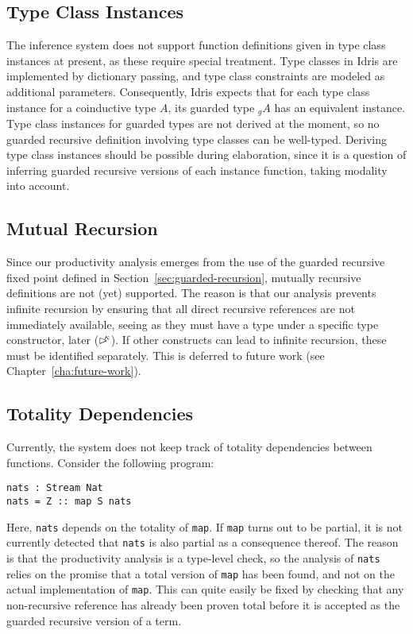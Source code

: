 \subsection{Type Class Instances}
\label{sec:type-class-instances}
The inference system does not support function definitions given in type class
instances at present, as these require special treatment. Type classes in Idris
are implemented by dictionary passing, and type class constraints are modeled as
additional parameters. Consequently, Idris expects that for each type class
instance for a coinductive type $A$, its guarded type $_gA$ has an equivalent
instance. Type class instances for guarded types are not derived at the moment,
so no guarded recursive definition involving type classes can be
well-typed. Deriving type class instances should be possible during elaboration,
since it is a question of inferring guarded recursive versions of each
instance function, taking modality into account.


\subsection{Mutual Recursion}
\label{sec:mutual-recursion}
Since our productivity analysis emerges from the use of the guarded recursive
fixed point defined in Section~\ref{sec:guarded-recursion}, mutually recursive
definitions are not (yet) supported. The reason is that our analysis prevents
infinite recursion by ensuring that all direct recursive references are not
immediately available, seeing as they must have a type under a specific type
constructor, later ($\rhd^{\!\!\kappa}$). If other constructs can lead to infinite
recursion, these must be identified separately. This is deferred to future work
(see Chapter~\ref{cha:future-work}).

\subsection{Totality Dependencies}
\label{sec:total-depend}
Currently, the system does not keep track of totality dependencies between
functions. Consider the following program:
\begin{lstlisting}[mathescape, title=\idrisBlock]
nats : Stream Nat
nats = Z :: map S nats
\end{lstlisting}
Here, \texttt{nats} depends on the totality of \texttt{map}. If \texttt{map}
turns out to be partial, it is not currently detected that \texttt{nats} is also
partial as a consequence thereof. The reason is that the productivity analysis
is a type-level check, so the analysis of \texttt{nats} relies on the promise that
a total version of \texttt{map} has been found, and not on the actual
implementation of \texttt{map}. This can quite easily be fixed by checking that
any non-recursive reference has already been proven total before it is accepted
as the guarded recursive version of a term.

